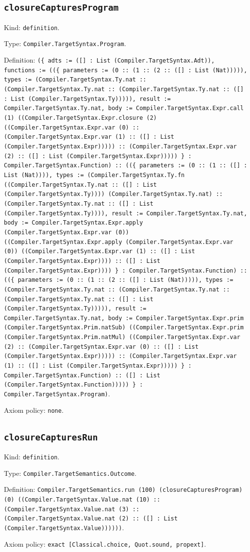 \documentclass[11pt]{article}
\begin{document}
\subsection*{\texttt{closureCapturesProgram}}
\noindent Kind: \texttt{definition}.\par
\noindent Type: \texttt{Compiler.TargetSyntax.Program}.\par
\noindent Definition: \texttt{(\{ adts := ([] : List (Compiler.TargetSyntax.Adt)), functions := ((\{ parameters := (0 :: (1 :: (2 :: ([] : List (Nat))))), types := (Compiler.TargetSyntax.Ty.nat :: (Compiler.TargetSyntax.Ty.nat :: (Compiler.TargetSyntax.Ty.nat :: ([] : List (Compiler.TargetSyntax.Ty))))), result := Compiler.TargetSyntax.Ty.nat, body := Compiler.TargetSyntax.Expr.call (1) ((Compiler.TargetSyntax.Expr.closure (2) ((Compiler.TargetSyntax.Expr.var (0) :: (Compiler.TargetSyntax.Expr.var (1) :: ([] : List (Compiler.TargetSyntax.Expr))))) :: (Compiler.TargetSyntax.Expr.var (2) :: ([] : List (Compiler.TargetSyntax.Expr))))) \} : Compiler.TargetSyntax.Function) :: ((\{ parameters := (0 :: (1 :: ([] : List (Nat)))), types := (Compiler.TargetSyntax.Ty.fn ((Compiler.TargetSyntax.Ty.nat :: ([] : List (Compiler.TargetSyntax.Ty)))) (Compiler.TargetSyntax.Ty.nat) :: (Compiler.TargetSyntax.Ty.nat :: ([] : List (Compiler.TargetSyntax.Ty)))), result := Compiler.TargetSyntax.Ty.nat, body := Compiler.TargetSyntax.Expr.apply (Compiler.TargetSyntax.Expr.var (0)) ((Compiler.TargetSyntax.Expr.apply (Compiler.TargetSyntax.Expr.var (0)) ((Compiler.TargetSyntax.Expr.var (1) :: ([] : List (Compiler.TargetSyntax.Expr)))) :: ([] : List (Compiler.TargetSyntax.Expr)))) \} : Compiler.TargetSyntax.Function) :: ((\{ parameters := (0 :: (1 :: (2 :: ([] : List (Nat))))), types := (Compiler.TargetSyntax.Ty.nat :: (Compiler.TargetSyntax.Ty.nat :: (Compiler.TargetSyntax.Ty.nat :: ([] : List (Compiler.TargetSyntax.Ty))))), result := Compiler.TargetSyntax.Ty.nat, body := Compiler.TargetSyntax.Expr.prim (Compiler.TargetSyntax.Prim.natSub) ((Compiler.TargetSyntax.Expr.prim (Compiler.TargetSyntax.Prim.natMul) ((Compiler.TargetSyntax.Expr.var (2) :: (Compiler.TargetSyntax.Expr.var (0) :: ([] : List (Compiler.TargetSyntax.Expr))))) :: (Compiler.TargetSyntax.Expr.var (1) :: ([] : List (Compiler.TargetSyntax.Expr))))) \} : Compiler.TargetSyntax.Function) :: ([] : List (Compiler.TargetSyntax.Function))))) \} : Compiler.TargetSyntax.Program)}.\par
\noindent Axiom policy: \texttt{none}.\par
\subsection*{\texttt{closureCapturesRun}}
\noindent Kind: \texttt{definition}.\par
\noindent Type: \texttt{Compiler.TargetSemantics.Outcome}.\par
\noindent Definition: \texttt{Compiler.TargetSemantics.run (100) (closureCapturesProgram) (0) ((Compiler.TargetSyntax.Value.nat (10) :: (Compiler.TargetSyntax.Value.nat (3) :: (Compiler.TargetSyntax.Value.nat (2) :: ([] : List (Compiler.TargetSyntax.Value))))))}.\par
\noindent Axiom policy: \texttt{exact [Classical.choice, Quot.sound, propext]}.\par
\end{document}

